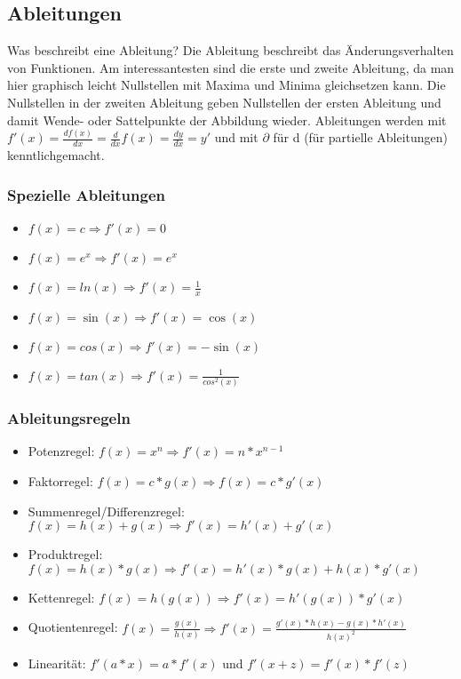 \documentclass[letterpaper, titlepage]{article}
\begin{document}
\subsection{Ableitungen}\label{Ableitungen}
Was beschreibt eine Ableitung? Die Ableitung beschreibt das Änderungsverhalten von Funktionen. Am interessantesten sind die erste und zweite Ableitung, da man hier graphisch leicht Nullstellen mit Maxima und Minima gleichsetzen kann. Die Nullstellen in der zweiten Ableitung geben Nullstellen der ersten Ableitung und damit Wende- oder Sattelpunkte der Abbildung wieder. Ableitungen werden mit $f'(x) = \frac{d f(x)}{dx} = \frac{d}{dx}f(x) = \frac{dy}{dx} = y'$ und mit $\partial$ für d (für partielle Ableitungen) kenntlichgemacht. 
\subsubsection{Spezielle Ableitungen}\label{Spezielle Ableitungen}
\begin{itemize}
    \item $f(x)=c \Rightarrow f'(x)=0$
    \item $f(x)=e^x \Rightarrow f'(x)=e^x$
    \item $f(x)=ln(x) \Rightarrow f'(x)=\frac{1}{x}$
    \item $f(x)=\sin(x) \Rightarrow f'(x)=\cos(x)$
    \item $f(x)=cos(x) \Rightarrow f'(x)=-\sin(x)$
    \item $f(x)=tan(x) \Rightarrow f'(x)=\frac{1}{cos^2(x)}$
\end{itemize}
\subsubsection{Ableitungsregeln}\label{Ableitungsregeln}
\begin{itemize}
    \item Potenzregel: $f(x)=x^n \Rightarrow f'(x)=n*x^{n-1}$
    \item Faktorregel: $f(x)=c*g(x) \Rightarrow f(x)=c*g'(x)$
    \item Summenregel/Differenzregel: $f(x)=h(x)+g(x) \Rightarrow f'(x)=h'(x)+g'(x)$
    \item Produktregel: $f(x)=h(x)*g(x) \Rightarrow f'(x)=h'(x)*g(x)+h(x)*g'(x)$
    \item Kettenregel: $f(x)=h(g(x)) \Rightarrow f'(x)=h'(g(x))*g'(x)$
    \item Quotientenregel: $f(x)=\frac{g(x)}{h(x)} \Rightarrow f'(x)=\frac{g'(x)*h(x)-g(x)*h'(x)}{h(x)^2} $
    \item Linearität: $f'(a*x)=a*f'(x)$ und $f'(x+z)=f'(x)*f'(z)$
\end{itemize}
\end{document}
